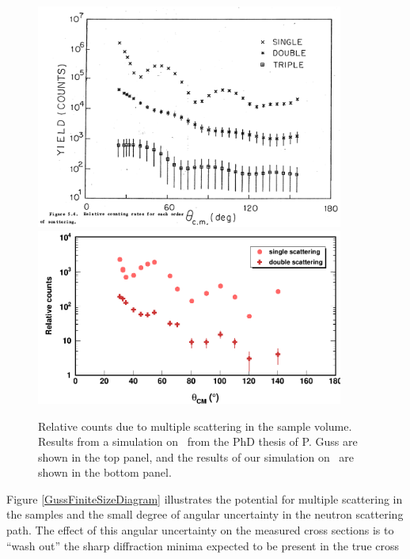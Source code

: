 \begin{figure}[ht!]
    \centering
    \includegraphics[width=0.9\textwidth]{figures/GussMultipleScattering.png}
    \label{GussMultipleScattering}
    \vspace*{\floatsep}
    \includegraphics[width=0.9\textwidth]{figures/multipleScattering.png}
    \caption[Relative counts due to multiple scattering in the sample volume]
    {
        Relative counts due to multiple scattering in the sample volume. Results from a simulation
        on \niEight\ from the PhD thesis of P. Guss \cite{GussPhDThesis} are shown in the top panel,
        and the results of our simulation on \snFour\ are shown in the bottom panel.
    }
    \label{multipleScattering}
\end{figure}
Figure \ref{GussFiniteSizeDiagram} illustrates the potential for multiple scattering in the samples
and the small degree of angular uncertainty in the neutron scattering path.
The effect of this angular uncertainty on the measured cross
sections is to ``wash out'' the sharp diffraction minima expected to be present in the true cross
